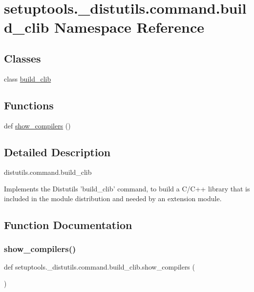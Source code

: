 \hypertarget{namespacesetuptools_1_1__distutils_1_1command_1_1build__clib}{}\section{setuptools.\+\_\+distutils.\+command.\+build\+\_\+clib Namespace Reference}
\label{namespacesetuptools_1_1__distutils_1_1command_1_1build__clib}
\subsection*{Classes}
\begin{DoxyCompactItemize}
\item 
class \hyperlink{classsetuptools_1_1__distutils_1_1command_1_1build__clib_1_1build__clib}{build\+\_\+clib}
\end{DoxyCompactItemize}
\subsection*{Functions}
\begin{DoxyCompactItemize}
\item 
def \hyperlink{namespacesetuptools_1_1__distutils_1_1command_1_1build__clib_adb47b3bf2be62abb9233821c8f5275f0}{show\+\_\+compilers} ()
\end{DoxyCompactItemize}


\subsection{Detailed Description}
\begin{DoxyVerb}distutils.command.build_clib

Implements the Distutils 'build_clib' command, to build a C/C++ library
that is included in the module distribution and needed by an extension
module.\end{DoxyVerb}
 

\subsection{Function Documentation}
\mbox{\label{namespacesetuptools_1_1__distutils_1_1command_1_1build__clib_adb47b3bf2be62abb9233821c8f5275f0}} 
\subsubsection{\texorpdfstring{show\+\_\+compilers()}{show\_compilers()}}
{\footnotesize\ttfamily def setuptools.\+\_\+distutils.\+command.\+build\+\_\+clib.\+show\+\_\+compilers (\begin{DoxyParamCaption}{ }\end{DoxyParamCaption})}

